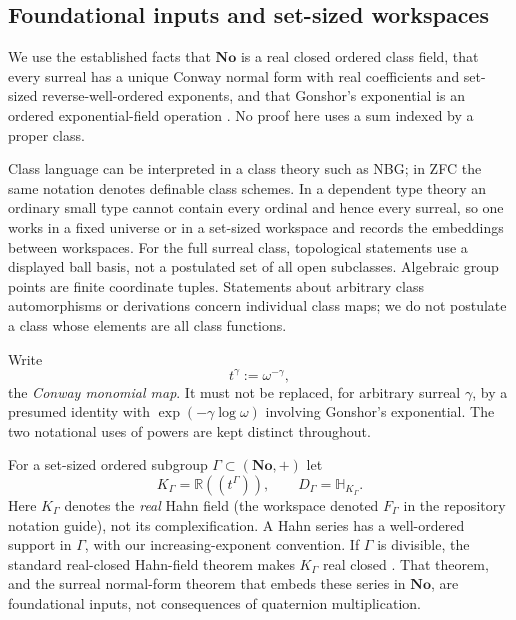 \documentclass[11pt,letterpaper]{article}
\numberwithin{equation}{section}
\theoremstyle{definition}
\theoremstyle{remark}
\newcommand{\No}{\mathbf{No}}
\newcommand{\R}{\mathbb R}
\begin{document}
\subsection{Foundational inputs and set-sized workspaces}\label{squat:sub:foundations}
We use the established facts that $\No$ is a real closed ordered class field, that every
surreal has a unique Conway normal form with real coefficients and set-sized
reverse-well-ordered exponents, and that Gonshor's exponential is an ordered
exponential-field operation \cite{Conway,Gonshor,vdDE,EK}. No proof here uses a sum
indexed by a proper class.

Class language can be interpreted in a class theory such as NBG; in ZFC the same
notation denotes definable class schemes. In a dependent type theory an ordinary small
type cannot contain every ordinal and hence every surreal, so one works in a fixed
universe or in a set-sized workspace and records the embeddings between workspaces. For
the full surreal class, topological statements use a displayed ball basis, not a
postulated set of all open subclasses. Algebraic group points are finite coordinate
tuples. Statements about arbitrary class automorphisms or derivations concern individual
class maps; we do not postulate a class whose elements are all class functions.

Write
\begin{equation}\label{squat:eq:monomial}
 t^\gamma:=\omega^{-\gamma},
\end{equation}
the \emph{Conway monomial map}. It must not be replaced, for arbitrary surreal $\gamma$,
by a presumed identity with $\exp(-\gamma\log\omega)$ involving Gonshor's exponential.
The two notational uses of powers are kept distinct throughout.

For a set-sized ordered subgroup $\Gamma\subset(\No,+)$ let
\[
 K_\Gamma=\R((t^\Gamma)),\qquad D_\Gamma=\mathbb H_{K_\Gamma}.
\]
Here $K_\Gamma$ denotes the \emph{real} Hahn field (the workspace denoted
$F_\Gamma$ in the repository notation guide), not its complexification. A Hahn series
has a well-ordered support in $\Gamma$, with our increasing-exponent convention.
If $\Gamma$ is divisible, the standard real-closed Hahn-field theorem makes
$K_\Gamma$ real closed \cite{Alling,EK}. That theorem, and the surreal normal-form
theorem that embeds these series in $\No$, are foundational inputs, not consequences of
quaternion multiplication.
\end{document}

